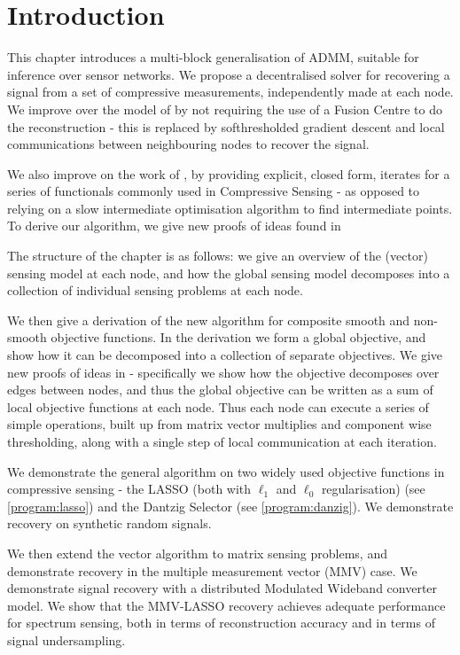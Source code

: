 \section{Introduction}

This chapter introduces a multi-block generalisation of ADMM, suitable for inference over sensor networks. We propose a decentralised solver for recovering a signal from a set of compressive measurements, independently made at each node. We improve over the model of \cite{Zhang2011b} by not requiring the use of a Fusion Centre to do the reconstruction - this is replaced by softhresholded gradient descent and local communications between neighbouring nodes to recover the signal. 

We also improve on the work of \cite{mota2013d}, by providing explicit, closed form, iterates for a series of functionals commonly used in Compressive Sensing - as opposed to relying on a slow intermediate optimisation algorithm to find intermediate points. To derive our algorithm, we give new proofs of ideas found in \cite{mota2013d}

The structure of the chapter is as follows: we give an overview of the (vector) sensing model at each node, and how the global sensing model decomposes into a collection of individual sensing problems at each node. 

We then give a derivation of the new algorithm for composite smooth and non-smooth objective functions. In the derivation we form a global objective, and show how it can be decomposed into a collection of separate objectives. We give new proofs of ideas in \cite{mota2013d} - specifically we show how the objective decomposes over edges between nodes, and thus the global objective can be written as a sum of local objective functions at each node. Thus each node can execute a series of simple operations, built up from matrix vector multiplies and component wise thresholding, along with a single step of local communication at each iteration.

We demonstrate the general algorithm on two widely used objective functions in compressive sensing - the LASSO (both with \(\ell_1\) and \(\ell_0\) regularisation) (see \eqref{program:lasso}) and the Dantzig Selector (see \eqref{program:danzig}). We demonstrate recovery on synthetic random signals.

We then extend the vector algorithm to matrix sensing problems, and demonstrate recovery in the multiple measurement vector (MMV) case. We demonstrate signal recovery with a distributed Modulated Wideband converter model. We show that the MMV-LASSO recovery achieves adequate performance for spectrum sensing, both in terms of reconstruction accuracy and in terms of signal undersampling. 


